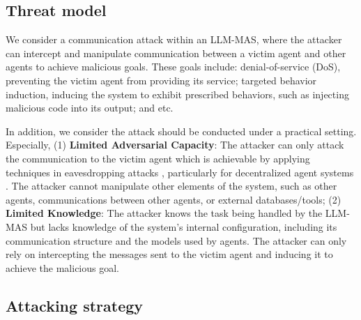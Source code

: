 \subsection{Threat model}\label{sec:threat model}
We consider a communication attack within an LLM-MAS, where the attacker can intercept and manipulate communication between a victim agent and other agents to achieve malicious goals. 
These goals include: denial-of-service (DoS), preventing the victim agent from providing its service; targeted behavior induction, inducing the system to exhibit prescribed behaviors, such as injecting malicious code into its output; and etc.

In addition, we consider the attack should be conducted under a practical setting. Especially, (1) \textbf{Limited Adversarial Capacity}: The attacker can only attack the communication to the victim agent which is achievable by applying techniques in eavesdropping attacks \citep{belapurkar2009distributed}, particularly for decentralized agent systems \citep{yang2024multi}. The attacker cannot manipulate other elements of the system, such as other agents, communications between other agents, or external databases/tools; (2) \textbf{Limited Knowledge}: The attacker knows the task being handled by the LLM-MAS but lacks knowledge of the system's internal configuration, including its communication structure and the models used by agents.
The attacker can only rely on intercepting the messages sent to the victim agent and inducing it to achieve the malicious goal. 


\subsection{Attacking strategy}


